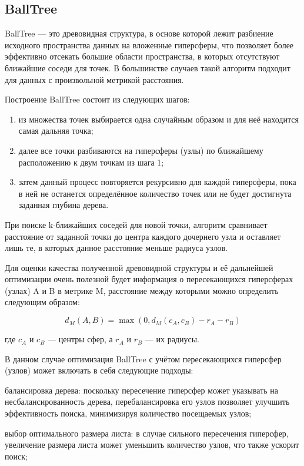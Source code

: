\subsection{BallTree}
BallTree — это древовидная структура, в основе которой лежит разбиение исходного пространства данных на вложенные гиперсферы, что позволяет более эффективно отсекать большие области пространства, в которых отсутствуют ближайшие соседи для точек. В большинстве случаев такой алгоритм подходит для данных с произвольной метрикой расстояния.  
  
Построение BallTree состоит из следующих шагов:  

\begin{enumerate}
    \item   
из множества точек выбирается одна случайным образом и для неё находится самая дальняя точка;
\item
далее все точки разбиваются на гиперсферы (узлы) по ближайшему расположению к двум точкам из шага 1;
\item
затем данный процесс повторяется рекурсивно для каждой гиперсферы, пока в ней не останется определённое количество точек или не будет достигнута заданная глубина дерева.
\end{enumerate}
При поиске k-ближайших соседей для новой точки, алгоритм сравнивает расстояние от заданной точки до центра каждого дочернего узла и оставляет лишь те, в которых данное расстояние меньше радиуса узлов.

Для оценки качества полученной древовидной структуры и её дальнейшей оптимизации очень полезной будет информация о пересекающихся гиперсферах (узлах) A и B в метрике M, расстояние между которыми можно определить следующим образом:

\[
d_M(A, B) = \max(0, d_M(c_A, c_{B}) - r_A - r_{B})
\]

где $c_A$ и $c_{B}$ — центры сфер, а $r_A$ и $r_B$ — их радиусы.


В данном случае оптимизация BallTree с учётом пересекающихся гиперсфер (узлов) может включать в себя следующие подходы:

балансировка дерева: поскольку пересечение гиперсфер может указывать на несбалансированность дерева, перебалансировка его узлов позволяет улучшить эффективность поиска, минимизируя количество посещаемых узлов;

выбор оптимального размера листа: в случае сильного пересечения гиперсфер, увеличение размера листа может уменьшить количество узлов, что также ускорит поиск;

